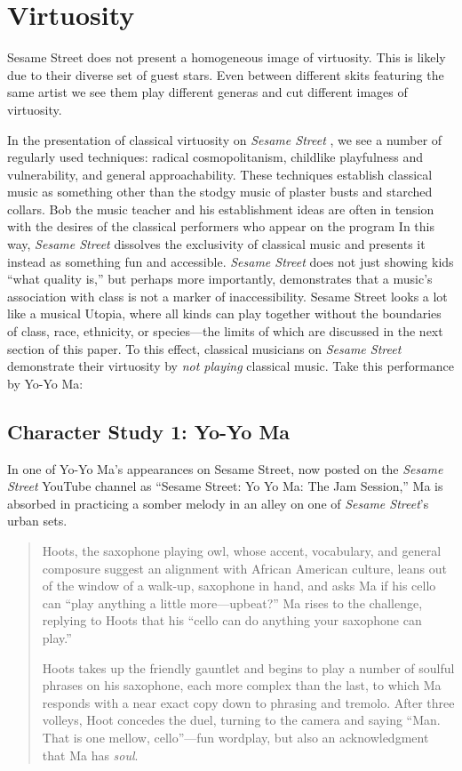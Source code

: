 \documentclass[12pt,letterpaper]{article}
\newcommand{\ses}{\textit{Sesame Street }}
\begin{document}
	\section*{Virtuosity}

	Sesame Street does not present a homogeneous image of virtuosity. This 
	is likely due to their diverse set of guest stars. Even between 
	different skits featuring the same artist we see them play different 
	generas and cut different images of virtuosity.

	In the presentation of classical virtuosity on \ses, we see a number
	of regularly used techniques: radical cosmopolitanism, childlike 
	playfulness and vulnerability, and general approachability. These 
	techniques establish classical music as something other than the stodgy 
	music of plaster busts and starched collars. Bob the music teacher and 
	his establishment ideas are often in tension with the desires of the 
	classical performers who appear on the program In this way, \ses 
	dissolves the exclusivity of classical music and presents it instead as
	something fun and accessible. \ses does not just showing kids ``what 
	quality is,'' but perhaps more importantly, demonstrates that a music's
	association with class is not a marker of inaccessibility. Sesame
	Street looks a lot like a musical Utopia, where all kinds can play 
	together without the boundaries of class, race, ethnicity, or 
	species---the limits of which are discussed in the next section of this
	paper. To this effect, classical musicians on \ses demonstrate their 
	virtuosity by \textit{not playing} classical music. Take this 
	performance by Yo-Yo Ma:

	\subsection*{Character Study 1: Yo-Yo Ma} 

	In one of Yo-Yo Ma's appearances on Sesame Street, now posted on the 
	\ses YouTube channel as ``Sesame Street: Yo Yo Ma: The Jam Session,'' 
	Ma is absorbed in practicing a somber melody in an alley on one of 
	\textit{Sesame Street}'s urban sets.

	\begin{quote}	
	Hoots, the saxophone playing owl, whose accent, vocabulary, and general
	composure suggest an alignment with African American culture, leans out
	of the window of a walk-up, saxophone in hand, and asks Ma if his cello
	can ``play anything a little more---upbeat?'' Ma rises to the challenge,
	replying to Hoots that his ``cello can do anything your saxophone can 
	play.''

	Hoots takes up the friendly gauntlet and begins to play a number of 
	soulful phrases on his saxophone, each more complex than the last, to 
	which Ma responds with a near exact copy down to phrasing and tremolo. 
	After three volleys, Hoot concedes the duel, turning to the camera and 
	saying ``Man. That is one mellow, cello''---fun wordplay, but also an 
	acknowledgment that Ma has \textit{soul}.

	\end{quote}
\end{document}
